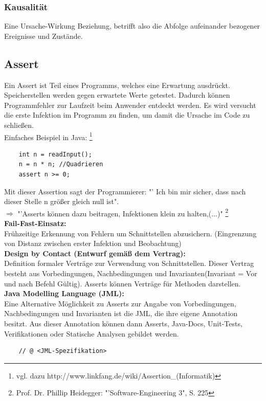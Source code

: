\documentclass[a4paper,10pt]{scrartcl}
\begin{document}
\subsubsection{Kausalität}
Eine Ursache-Wirkung Beziehung, betrifft also die Abfolge aufeinander bezogener Ereignisse und Zustände.
\newpage

\subsection{Assert}
    Ein Assert ist Teil eines Programms, welches eine Erwartung ausdrückt. Speicherstellen werden gegen erwartete Werte getestet. Dadurch können Programmfehler zur Laufzeit beim Anwender entdeckt werden. Es wird versucht die erste Infektion im Programm zu finden, um damit die Ursache im Code zu schließen.\\
    Einfaches Beispiel in Java:
    \footnote{vgl. dazu http://www.linkfang.de/wiki/Assertion_(Informatik)}
    \begin{lstlisting}
    int n = readInput(); 
    n = n * n; //Quadrieren 
    assert n >= 0;
    \end{lstlisting}
    Mit dieser Assertion sagt der Programmierer: "' Ich bin mir sicher, dass nach dieser Stelle n größer gleich null ist".\\
    $\Rightarrow$ "'Asserts können dazu beitragen, Infektionen klein zu halten,(...)"
    \footnote{Prof. Dr. Phillip Heidegger: "'Software-Engineering 3", S. 225}
	\\\textbf{Fail-Fast-Einsatz:}\\
	Frühzeitige Erkennung von Fehlern um Schnittstellen abzusichern. (Eingrenzung von Distanz zwischen erster Infektion und Beobachtung)
	\\\textbf{Design by Contact (Entwurf gemäß dem Vertrag):}\\ Definition formaler Verträge zur Verwendung von Schnittstellen. Dieser Vertrag besteht aus Vorbedingungen, Nachbedingungen und Invarianten(Invariant = Vor und nach Befehl Gültig). Asserts können Verträge für Methoden darstellen.
	\\\textbf{Java Modelling Language (JML):}\\
	Eine Alternative Möglichkeit zu Asserts zur Angabe von Vorbedingungen, Nachbedingungen und Invarianten ist die JML, die ihre eigene Annotation besitzt. Aus dieser Annotation können dann Asserts, Java-Docs, Unit-Tests, Verifikationen oder Statische Analysen gebildet werden.
	\begin{lstlisting}
	// @ <JML-Spezifikation>
	\end{lstlisting}
\end{document}
